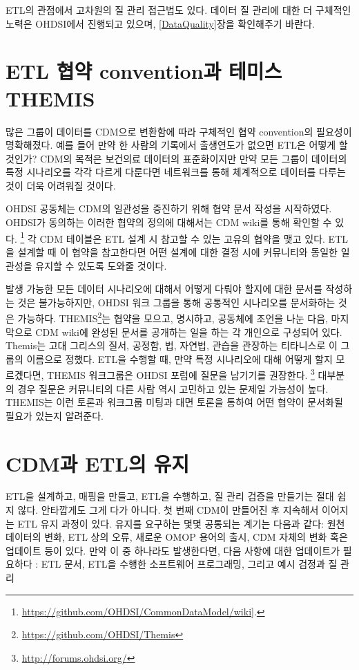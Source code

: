 \documentclass[10.5pt]{book}
\let\rmarkdownfootnote\footnote%
\def\footnote{\protect\rmarkdownfootnote}
\theoremstyle{definition}
\theoremstyle{definition}
\theoremstyle{definition}
\theoremstyle{remark}
\begin{document}
ETL의 관점에서 고차원의 질 관리 접근법도 있다. 데이터 질 관리에 대한 더
구체적인 노력은 OHDSI에서 진행되고 있으며, \ref{DataQuality}장을
확인해주기 바란다.

\section{ETL 협약 convention과 테미스
THEMIS}\label{etl--convention--themis}

많은 그룹이 데이터를 CDM으로 변환함에 따라 구체적인 협약 convention의
필요성이 명확해졌다. 예를 들어 만약 한 사람의 기록에서 출생연도가 없으면
ETL은 어떻게 할 것인가? CDM의 목적은 보건의료 데이터의 표준화이지만 만약
모든 그룹이 데이터의 특정 시나리오를 각각 다르게 다룬다면 네트워크를
통해 체계적으로 데이터를 다루는 것이 더욱 어려워질 것이다.

OHDSI 공동체는 CDM의 일관성을 증진하기 위해 협약 문서 작성을 시작하였다.
OHDSI가 동의하는 이러한 협약의 정의에 대해서는 CDM wiki를 통해 확인할 수
있다. \footnote{\url{https://github.com/OHDSI/CommonDataModel/wiki}{]}.}
각 CDM 테이블은 ETL 설계 시 참고할 수 있는 고유의 협약을 맺고 있다.
ETL을 설계할 때 이 협약을 참고한다면 어떤 설계에 대한 결정 시에
커뮤니티와 동일한 일관성을 유지할 수 있도록 도와줄 것이다.

발생 가능한 모든 데이터 시나리오에 대해서 어떻게 다뤄야 할지에 대한
문서를 작성하는 것은 불가능하지만, OHDSI 워크 그룹을 통해 공통적인
시나리오를 문서화하는 것은 가능하다. THEMIS\footnote{\url{https://github.com/OHDSI/Themis}}는
협약을 모으고, 명시하고, 공동체에 조언을 나눈 다음, 마지막으로 CDM
wiki에 완성된 문서를 공개하는 일을 하는 각 개인으로 구성되어 있다.
Themis는 고대 그리스의 질서, 공정함, 법, 자연법, 관습을 관장하는
티타니스로 이 그룹의 이름으로 정했다. ETL을 수행할 때, 만약 특정
시나리오에 대해 어떻게 할지 모르겠다면, THEMIS 워크그룹은 OHDSI 포럼에
질문을 남기기를 권장한다. \footnote{\url{http://forums.ohdsi.org/}}
대부분의 경우 질문은 커뮤니티의 다른 사람 역시 고민하고 있는 문제일
가능성이 높다. THEMIS는 이런 토론과 워크그룹 미팅과 대면 토론을 통하여
어떤 협약이 문서화될 필요가 있는지 알려준다.

\section{CDM과 ETL의 유지}\label{CDMandETLMaintenance}

ETL을 설계하고, 매핑을 만들고, ETL을 수행하고, 질 관리 검증을 만들기는
절대 쉽지 않다. 안타깝게도 그게 다가 아니다. 첫 번째 CDM이 만들어진 후
지속해서 이어지는 ETL 유지 과정이 있다. 유지를 요구하는 몇몇 공통되는
계기는 다음과 같다: 원천 데이터의 변화, ETL 상의 오류, 새로운 OMOP
용어의 출시, CDM 자체의 변화 혹은 업데이트 등이 있다. 만약 이 중
하나라도 발생한다면, 다음 사항에 대한 업데이트가 필요하다 : ETL 문서,
ETL을 수행한 소프트웨어 프로그래밍, 그리고 예시 검정과 질 관리
\end{document}
